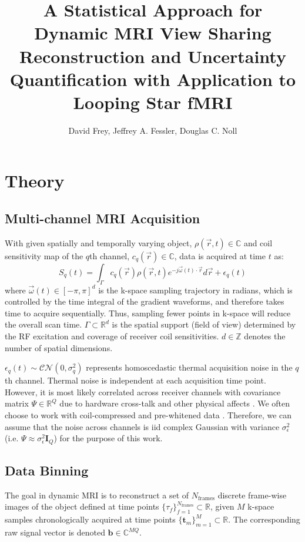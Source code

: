 \documentclass[11pt]{article}
\title{\vspace{-2em}
\bfseries\large
A Statistical Approach for Dynamic MRI View Sharing Reconstruction and Uncertainty Quantification with Application to Looping Star fMRI
\vspace{-1.5em}
}
\author{
    \small
David Frey, Jeffrey A. Fessler, Douglas C. Noll
}
\date{}
\begin{document}
\maketitle

\section{Theory}

\subsection{Multi-channel MRI Acquisition}
With given spatially and temporally varying object, $\rho(\vec{r},t) \in \mathbb{C}$ and coil sensitivity map of the $q$th channel, $c_q(\vec{r}) \in \mathbb{C}$, data is acquired at time $t$ as:
\begin{equation} \label{eq:signal_eq}
    S_q(t) = \int_{\Gamma} c_q(\vec{r}) \rho(\vec{r},t) e^{-j\vec{\omega}(t) \cdot \vec{r}} d\vec{r} + \epsilon_q(t)
\end{equation}
where $\vec{\omega}(t) \in [-\pi,\pi]^{d}$ is the k-space sampling trajectory in radians, which is controlled by the time integral of the gradient waveforms, and therefore takes time to acquire sequentially.
Thus, sampling fewer points in k-space will reduce the overall scan time.
$\Gamma \subset \mathbb{R}^d$ is the spatial support (field of view) determined by the RF excitation and coverage of receiver coil sensitivities.
$d \in \mathbb{Z}$ denotes the number of spatial dimensions.

$\epsilon_q(t) \sim \mathcal{CN}(0, \sigma_q^2)$ represents homoscedastic thermal acquisition noise in the $q$th channel.
Thermal noise is independent at each acquisition time point.
However, it is most likely correlated across receiver channels with covariance matrix $\Psi \in \mathbb{R}^Q$ due to hardware cross-talk and other physical affects \cite{triantafyllou_2017}.
We often choose to work with coil-compressed and pre-whitened data \cite{zhang_2013}.
Therefore, we can assume that the noise across channels is iid complex Gaussian with variance $\sigma_\epsilon^2$ (i.e. $\Psi \approx \sigma_\epsilon^2 \mathbf{I}_Q$) for the purpose of this work.

\subsection{Data Binning}
The goal in dynamic MRI is to reconstruct a set of $N_\mathrm{frames}$ discrete frame-wise images of the object defined at time points $\{\tau_f\}_{f=1}^{N_\mathrm{frames}} \subset \mathbb{R}$,
given $M$ k-space samples chronologically acquired at time points $\{\mathbf{t}_m\}_{m=1}^{M} \subset \mathbb{R}$.
The corresponding raw signal vector is denoted $\mathbf{b} \in \mathbb{C}^{MQ}$. 
\end{document}
